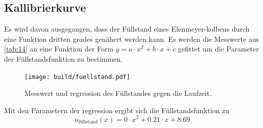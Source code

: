 \subsection{Kallibrierkurve}
Es wird davon ausgegangen, dass der Füllstand eines Elenmeyer-kolbens 
durch eine Funktion dritten grades genähert werden kann. Es werden die Messwerte 
aus \autoref{tab:14} an eine Funktion der Form $y = a \cdot x^2 + b \cdot x + c $ gefittet 
um die Parameter der Füllstandsfunktion zu bestimmen. 
\begin{figure}[H]
    \centering
    \caption{Messwert und regression des Füllstandes gegen die Laufzeit.}
    \label{fig:15}
    \texttt{[image: build/fuellstand.pdf]}
\end{figure}

Mit den Parametern der regression ergibt sich die Füllstandsfunktion zu 
\begin{equation}
    u_\text{füllstand}(x) = 0 \cdot x^2 + 0.21 \cdot x + 8.69 
\end{equation}

